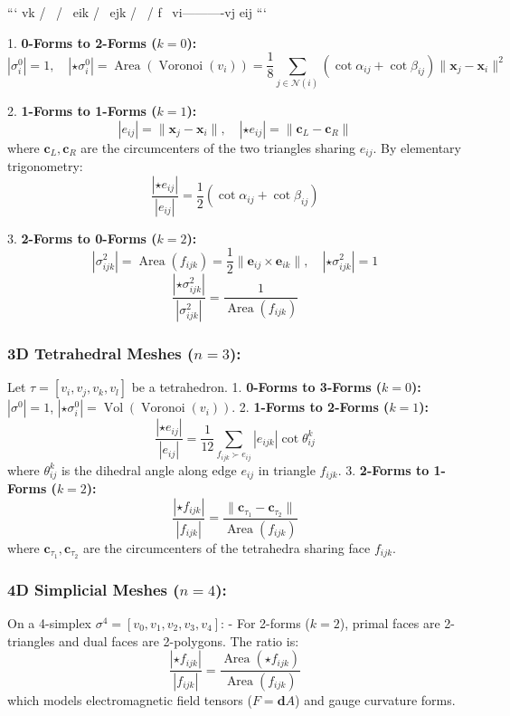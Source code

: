 \documentclass[11pt,twoside,openright]{amsbook}
\begin{document}
```
               vk
              /  \
             /    \
        eik /      \ ejk
           /        \
          /    f     \
         vi----------vj
              eij
```

1. \textbf{0-Forms to 2-Forms ($k = 0$):}
   $$|\sigma^0_i| = 1, \quad |\star \sigma^0_i| = \operatorname{Area}(\operatorname{Voronoi}(v_i)) = \frac{1}{8} \sum_{j \in \mathcal{N}(i)} (\cot \alpha_{ij} + \cot \beta_{ij}) \|\mathbf{x}_j - \mathbf{x}_i\|^2$$

2. \textbf{1-Forms to 1-Forms ($k = 1$):}
   $$|e_{ij}| = \|\mathbf{x}_j - \mathbf{x}_i\|, \quad |\star e_{ij}| = \|\mathbf{c}_L - \mathbf{c}_R\|$$
   where $\mathbf{c}_L, \mathbf{c}_R$ are the circumcenters of the two triangles sharing $e_{ij}$. By elementary trigonometry:
   $$\frac{|\star e_{ij}|}{|e_{ij}|} = \frac{1}{2} (\cot \alpha_{ij} + \cot \beta_{ij})$$

3. \textbf{2-Forms to 0-Forms ($k = 2$):}
   $$|\sigma^2_{ijk}| = \operatorname{Area}(f_{ijk}) = \frac{1}{2} \|\mathbf{e}_{ij} \times \mathbf{e}_{ik}\|, \quad |\star \sigma^2_{ijk}| = 1$$
   $$\frac{|\star \sigma^2_{ijk}|}{|\sigma^2_{ijk}|} = \frac{1}{\operatorname{Area}(f_{ijk})}$$

\subsubsection{3D Tetrahedral Meshes ($n = 3$):}
Let $\tau = [v_i, v_j, v_k, v_l]$ be a tetrahedron.
1. \textbf{0-Forms to 3-Forms ($k = 0$):} $|\sigma^0| = 1$, $|\star \sigma^0_i| = \operatorname{Vol}(\operatorname{Voronoi}(v_i))$.
2. \textbf{1-Forms to 2-Forms ($k = 1$):}
   $$\frac{|\star e_{ij}|}{|e_{ij}|} = \frac{1}{12} \sum_{f_{ijk} \succ e_{ij}} |e_{ijk}| \cot \theta_{ij}^k$$
   where $\theta_{ij}^k$ is the dihedral angle along edge $e_{ij}$ in triangle $f_{ijk}$.
3. \textbf{2-Forms to 1-Forms ($k = 2$):}
   $$\frac{|\star f_{ijk}|}{|f_{ijk}|} = \frac{\|\mathbf{c}_{\tau_1} - \mathbf{c}_{\tau_2}\|}{\operatorname{Area}(f_{ijk})}$$
   where $\mathbf{c}_{\tau_1}, \mathbf{c}_{\tau_2}$ are the circumcenters of the tetrahedra sharing face $f_{ijk}$.

\subsubsection{4D Simplicial Meshes ($n = 4$):}
On a 4-simplex $\sigma^4 = [v_0, v_1, v_2, v_3, v_4]$:
- For 2-forms ($k = 2$), primal faces are 2-triangles and dual faces are 2-polygons. The ratio is:
  $$\frac{|\star f_{ijk}|}{|f_{ijk}|} = \frac{\operatorname{Area}(\star f_{ijk})}{\operatorname{Area}(f_{ijk})}$$
  which models electromagnetic field tensors ($F = \mathbf{d}A$) and gauge curvature forms.
\end{document}
